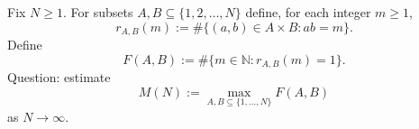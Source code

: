 Fix $N\ge 1$.
For subsets $A,B\subseteq\{1,2,\dots,N\}$ define, for each integer $m\ge 1$,
\[
 r_{A,B}(m):=\#\{(a,b)\in A\times B: ab=m\}.
\]
Define
\[
 F(A,B):=\#\{m\in\mathbb{N}: r_{A,B}(m)=1\}.
\]
Question: estimate
\[ M(N):=\max_{A,B\subseteq\{1,\dots,N\}} F(A,B)\]
as $N\to\infty$.
